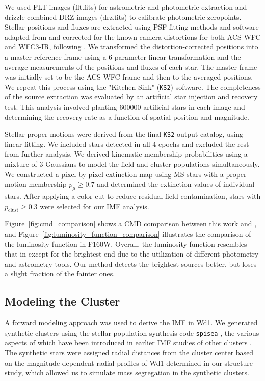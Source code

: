 \documentclass[12pt]{ucsddissertation}
\newcommand{\pclust}{p_{\mathrm{clust}}}
\begin{document}
\begin{CJK*}{UTF8}{gbsn}
We used FLT images (flt.fits) for astrometric and photometric extraction and drizzle combined DRZ images (drz.fits) to calibrate photometric zeropoints. Stellar positions and fluxes are extracted using PSF-fitting methods and software adapted from \citet{Anderson-2010} and corrected for the known camera distortions for both ACS-WFC and WFC3-IR, following \citet{Anderson-2006}. We transformed the distortion-corrected positions into a master reference frame using a 6-parameter linear transformation and the average measurements of the positions and fluxes of each star. The master frame was initially set to be the ACS-WFC frame and then to the averaged positions. We repeat this process using the "Kitchen Sink" (\texttt{KS2}) software. The completeness of the source extraction was evaluated by an artificial star injection and recovery test. This analysis involved planting \num{600000} artificial stars in each image and determining the recovery rate as a function of spatial position and magnitude.

Stellar proper motions were derived from the final \texttt{KS2} output catalog, using linear fitting. We included stars detected in all $4$ epochs and excluded the rest from further analysis. We derived kinematic membership probabilities using a mixture of $3$ Gaussians to model the field and cluster populations simultaneously. We constructed a pixel-by-pixel extinction map using MS stars with a proper motion membership $p_\mu \geq 0.7$ and determined the extinction values of individual stars. After applying a color cut to reduce residual field contamination, stars with $\pclust \geq 0.3$ were selected for our IMF analysis.

Figure~\ref{fig:cmd_comparison} shows a CMD comparison between this work and \citet{Andersen-2017}, and Figure~\ref{fig:luminosity_function_comparison} illustrates the comparison of the luminosity function in F160W. Overall, the luminosity function resembles that in \citet{Andersen-2017} except for the brightest end due to the utilization of different photometry and astrometry tools. Our method detects the brightest sources better, but loses a slight fraction of the fainter ones.

\subsection{Modeling the Cluster}
A forward modeling approach was used to derive the IMF in Wd1. We generated synthetic clusters using the stellar population synthesis code \texttt{spisea} \citep[][]{spisea}, the various aspects of which have been introduced in earlier IMF studies of other clusters \citep[][]{Hosek-2019}. The synthetic stars were assigned radial distances from the cluster center based on the magnitude-dependent radial profiles of Wd1 determined in our structure study, which allowed us to simulate mass segregation in the synthetic clusters. 


\end{CJK*}
\end{document}
